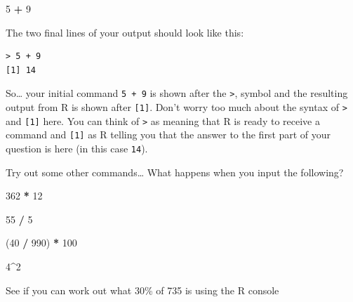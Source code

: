\documentclass[
]{book}
\newenvironment{Shaded}{\begin{snugshade}}{\end{snugshade}}
\newcommand{\DecValTok}[1]{\textcolor[rgb]{0.00,0.00,0.81}{#1}}
\newcommand{\NormalTok}[1]{#1}
\newcommand{\SpecialCharTok}[1]{\textcolor[rgb]{0.81,0.36,0.00}{\textbf{#1}}}
\begin{document}
\begin{Shaded}
\begin{Highlighting}[]
\DecValTok{5} \SpecialCharTok{+} \DecValTok{9}
\end{Highlighting}
\end{Shaded}

The two final lines of your output should look like this:

\begin{verbatim}
> 5 + 9
[1] 14
\end{verbatim}

So\ldots{} your initial command \texttt{5\ +\ 9} is shown after the \texttt{\textgreater{}}, symbol and the resulting output from R is shown after \texttt{{[}1{]}}. Don't worry too much about the syntax of \texttt{\textgreater{}} and \texttt{{[}1{]}} here. You can think of \texttt{\textgreater{}} as meaning that R is ready to receive a command and \texttt{{[}1{]}} as R telling you that the answer to the first part of your question is here (in this case \texttt{14}).

Try out some other commands\ldots{} What happens when you input the following?

\begin{Shaded}
\begin{Highlighting}[]
\DecValTok{362} \SpecialCharTok{*} \DecValTok{12}
\end{Highlighting}
\end{Shaded}

\begin{Shaded}
\begin{Highlighting}[]
\DecValTok{55} \SpecialCharTok{/} \DecValTok{5}
\end{Highlighting}
\end{Shaded}

\begin{Shaded}
\begin{Highlighting}[]
\NormalTok{(}\DecValTok{40} \SpecialCharTok{/} \DecValTok{990}\NormalTok{) }\SpecialCharTok{*} \DecValTok{100}
\end{Highlighting}
\end{Shaded}

\begin{Shaded}
\begin{Highlighting}[]
\DecValTok{4}\SpecialCharTok{\^{}}\DecValTok{2}
\end{Highlighting}
\end{Shaded}

See if you can work out what 30\% of 735 is using the R console
\end{document}
